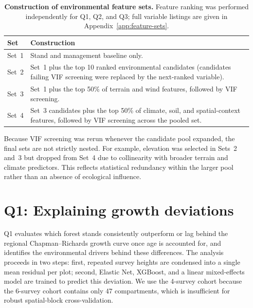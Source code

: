 \documentclass[logo,msc,ai]{infthesis}           %
\begin{document}
\begin{table}[H]
\centering
\scriptsize
\renewcommand{\arraystretch}{1.2}
\begin{tabularx}{\linewidth}{@{}p{1.4cm}X@{}}
\toprule
Set & Construction \\
\midrule
Set~1 & Stand and management baseline only. \\
Set~2 & Set~1 plus the top 10 ranked environmental candidates (candidates failing VIF screening were replaced by the next-ranked variable). \\
Set~3 & Set~1 plus the top 50\% of terrain and wind features, followed by VIF screening. \\
Set~4 & Set~3 candidates plus the top 50\% of climate, soil, and spatial-context features, followed by VIF screening across the pooled set. \\
\bottomrule
\end{tabularx}
\caption{\textbf{Construction of environmental feature sets.} Feature ranking was performed independently for Q1, Q2, and Q3; full variable listings are given in Appendix~\ref{app:feature-sets}.}
\label{tab:feature-sets-construction}
\end{table}

Because VIF screening was rerun whenever the candidate pool expanded, the final sets are not strictly nested. For example, elevation was selected in Sets~2 and~3 but dropped from Set~4 due to collinearity with broader terrain and climate predictors. This reflects statistical redundancy within the larger pool rather than an absence of ecological influence.
\section{Q1: Explaining growth deviations}
Q1 evaluates which forest stands consistently outperform or lag behind the regional Chapman--Richards growth curve once age is accounted for, and identifies the environmental drivers behind these differences. The analysis proceeds in two steps: first, repeated survey heights are condensed into a single mean residual per plot; second, Elastic Net, XGBoost, and a linear mixed-effects model are trained to predict this deviation. We use the 4-survey cohort because the 6-survey cohort contains only 47 compartments, which is insufficient for robust spatial-block cross-validation.
\end{document}
